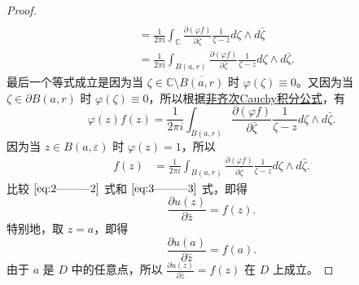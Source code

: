 \documentclass[../../main.tex]{subfiles}
\begin{document}
\begin{proof}
\begin{align}
\nonumber 
\\
&=\frac{1}{2\pi \mathrm{i}}\int_{\mathbb{C}}{\frac{\partial (\varphi f)}{\partial \bar{\zeta}}\frac{1}{\zeta -z}d\zeta}\land d\bar{\zeta}
\nonumber 
\\
&=\frac{1}{2\pi \mathrm{i}}\int_{B(a,r)}{\frac{\partial (\varphi f)}{\partial \bar{\zeta}}\frac{1}{\zeta -z}d\zeta}\land d\bar{\zeta}.\label{eq:2---------2}
\end{align}
最后一个等式成立是因为当 \( \zeta \in \mathbb{C} \setminus \overline{B(a,r)} \) 时 \( \varphi(\zeta) \equiv 0 \)。又因为当 \( \zeta \in \partial B(a,r) \) 时 \( \varphi(\zeta) \equiv 0 \)，所以根据\hyperref[theorem:非齐次Cauchy积分公式(Pompeiu公式)]{非齐次Cauchy积分公式}，有
\[
\varphi(z)f(z) = \frac{1}{2\pi i} \int_{B(a,r)} \frac{\partial(\varphi f)}{\partial \bar{\zeta}} \frac{1}{\zeta - z} d\zeta \wedge d\bar{\zeta}.
\]
因为当 \( z \in B(a,\varepsilon) \) 时 \( \varphi(z) = 1 \)，所以
\begin{align}
f(z) &= \frac{1}{2\pi i} \int_{B(a,r)} \frac{\partial(\varphi f)}{\partial \bar{\zeta}} \frac{1}{\zeta - z} d\zeta \wedge d\bar{\zeta}. \label{eq:3---------3}
\end{align}
比较 \(\eqref{eq:2---------2}\) 式和 \(\eqref{eq:3---------3}\) 式，即得
\[
\frac{\partial u(z)}{\partial \bar{z}} = f(z).
\]
特别地，取 \( z = a \)，即得
\[
\frac{\partial u(a)}{\partial \bar{z}} = f(a).
\]
由于 \( a \) 是 \( D \) 中的任意点，所以 \( \frac{\partial u(z)}{\partial \bar{z}} = f(z) \) 在 \( D \) 上成立。
\end{proof}
\end{document}
